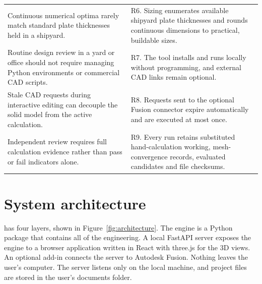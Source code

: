 \begin{table}[H]
\begin{tabularx}{\textwidth}{>{\raggedright\arraybackslash}p{}>{\raggedright\arraybackslash}X}
Continuous numerical optima rarely match standard plate thicknesses held in a shipyard. &
R6. Sizing enumerates available shipyard plate thicknesses and rounds continuous dimensions to practical, buildable sizes.\\
Routine design review in a yard or office should not require managing Python environments or commercial CAD scripts. &
R7. The tool installs and runs locally without programming, and external CAD links remain optional.\\
Stale CAD requests during interactive editing can decouple the solid model from the active calculation. &
R8. Requests sent to the optional Fusion connector expire automatically and are executed at most once.\\
Independent review requires full calculation evidence rather than pass or fail indicators alone. &
R9. Every run retains substituted hand-calculation working, mesh-convergence records, evaluated candidates and file checksums.\\
\bottomrule
\end{tabularx}
\end{table}

\section{System architecture}
\label{sec:architecture}

\NEMO{} has four layers, shown in Figure~\ref{fig:architecture}. The
engine is a Python package that contains all of the engineering. A local
FastAPI server exposes the engine to a browser application written in React
with three.js for the 3D views. An optional add-in connects the server to
Autodesk Fusion. Nothing leaves the user's computer. The server listens only on
the local machine, and project files are stored in the user's documents
folder.

